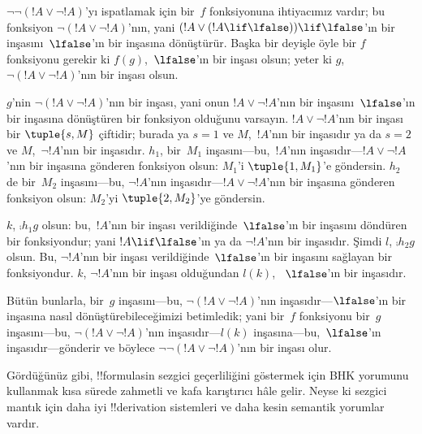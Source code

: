 \documentclass[../../../include/open-logic-section]{subfiles}
\begin{document}
\begin{ex}
$\lnot \lnot (!A \lor \lnot !A)$'yı ispatlamak için bir~$f$ fonksiyonuna
ihtiyacımız vardır; bu fonksiyon $\lnot(!A \lor \lnot !A)$'nın, yani $(!A
\lor (!A \lif \lfalse)) \lif \lfalse$'ın bir inşasını~$\lfalse$'ın bir
inşasına dönüştürür. Başka bir deyişle öyle bir $f$ fonksiyonu gerekir ki
$f(g)$,~$\lfalse$'ın bir inşası olsun; yeter ki $g$, $\lnot(!A \lor \lnot
!A)$'nın bir inşası olsun.

$g$'nin $\lnot(!A \lor \lnot !A)$'nın bir inşası, yani onun $!A \lor
\lnot !A$'nın bir inşasını~$\lfalse$'ın bir inşasına dönüştüren bir fonksiyon
olduğunu varsayın. $!A \lor \lnot !A$'nın bir inşası bir $\tuple{s, M}$
çiftidir; burada ya $s = 1$ ve $M$,~$!A$'nın bir inşasıdır ya da $s = 2$ ve
$M$,~$\lnot !A$'nın bir inşasıdır. $h_1$, bir~$M_1$ inşasını---bu,~$!A$'nın
inşasıdır---$!A \lor \lnot !A$'nın bir inşasına gönderen fonksiyon olsun:
$M_1$'i $\tuple{1, M_1}$'e göndersin. $h_2$ de bir~$M_2$ inşasını---bu,
$\lnot !A$'nın inşasıdır---$!A \lor \lnot !A$'nın bir inşasına gönderen
fonksiyon olsun: $M_2$'yi $\tuple{2, M_2}$'ye göndersin.

$k$, $\comp{h_1}{g}$ olsun: bu,~$!A$'nın bir inşası verildiğinde~$\lfalse$'ın
bir inşasını döndüren bir fonksiyondur; yani $!A \lif \lfalse$'ın ya da
$\lnot !A$'nın bir inşasıdır. Şimdi $l$, $\comp{h_2}{g}$ olsun. Bu,
$\lnot !A$'nın bir inşası verildiğinde~$\lfalse$'ın bir inşasını sağlayan bir
fonksiyondur. $k$, $\lnot !A$'nın bir inşası olduğundan $l(k)$,
~$\lfalse$'ın bir inşasıdır.

Bütün bunlarla, bir~$g$ inşasını---bu, $\lnot(!A \lor \lnot !A)$'nın
inşasıdır---$\lfalse$'ın bir inşasına nasıl dönüştürebileceğimizi betimledik;
yani bir~$f$ fonksiyonu bir~$g$ inşasını---bu, $\lnot(!A \lor \lnot !A)$'nın
inşasıdır---$l(k)$ inşasına---bu,~$\lfalse$'ın inşasıdır---gönderir ve böylece
$\lnot\lnot(!A \lor \lnot !A)$'nın bir inşası olur.
\end{ex}

Gördüğünüz gibi, !!{formula}s{}in sezgici geçerliliğini göstermek için BHK
yorumunu kullanmak kısa sürede zahmetli ve kafa karıştırıcı hâle gelir. Neyse
ki sezgici mantık için daha iyi !!{derivation} sistemleri ve daha kesin
semantik yorumlar vardır.
\end{document}
